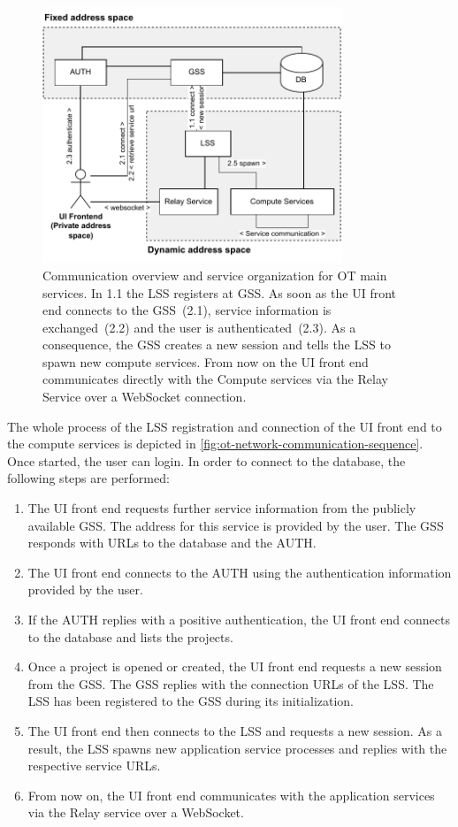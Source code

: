 \begin{figure}[ht]
	\centering
	\includegraphics[width=0.8\textwidth]{Figures/opentwin-network-communication-diagram.pdf}
	\caption{Communication overview and service organization for \ac{OT} main services. In 1.1 the \ac{LSS} registers at \ac{GSS}. As soon as the \ac{UI} front end connects to the \ac{GSS}~(2.1), service information is exchanged~(2.2) and the user is authenticated~(2.3). As a consequence, the \ac{GSS} creates a new session and tells the \ac{LSS} to spawn new compute services. From now on the \ac{UI} front end communicates directly with the Compute services via the Relay Service over a WebSocket connection.}
	\label{fig:ot-network-communication-diagram}
\end{figure}


The whole process of the \ac{LSS} registration and connection of the \ac{UI} front end to the compute services is depicted in \autoref{fig:ot-network-communication-sequence}.
Once started, the user can login. In order to connect to the database, the following steps are performed:
\begin{enumerate}
\item The \ac{UI} front end requests further service information from the publicly available \ac{GSS}. The address for this service is provided by the user. The \ac{GSS} responds with \acp{URL} to the database and the \ac{AUTH}.
\item The \ac{UI} front end connects to the \ac{AUTH} using the authentication information provided by the user.
\item If the \ac{AUTH} replies with a positive authentication, the \ac{UI} front end connects to the database and lists the projects.
\item Once a project is opened or created, the \ac{UI} front end requests a new session from the \ac{GSS}. The \ac{GSS} replies with the connection \acp{URL} of the \ac{LSS}. The \ac{LSS} has been registered to the \ac{GSS} during its initialization.
\item The \ac{UI} front end then connects to the \ac{LSS} and requests a new session. As a result, the \ac{LSS} spawns new application service processes and replies with the respective service \acp{URL}.
\item From now on, the \ac{UI} front end communicates with the application services via the Relay service over a WebSocket.
\end{enumerate}

